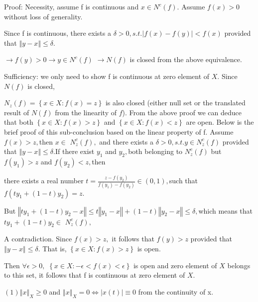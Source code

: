 \documentclass{article}
\begin{document}
Proof: Necessity, assume f is continuous and $x\in N^{c}\left( f\right) .$%
Assume $f\left( x\right) >0$ without loss of generality.

Since f is continuous, there exists a $\delta >0,s.t.\left\vert f\left(
x\right) -f\left( y\right) \right\vert <f\left( x\right) $ provided that $%
\left\Vert y-x\right\Vert \leq \delta .$

$\rightarrow f\left( y\right) >0\rightarrow y\in N^{c}\left( f\right) $ $%
\rightarrow N\left( f\right) $ is closed from the above equivalence.

Sufficiency: we only need to show f is continuous at zero element of $X.$
Since $N\left( f\right) $ is closed,

$N_{z}\left( f\right) =\left\{ x\in X:f\left( x\right) =z\right\} $ is also
closed (either null set or the translated result of  $N\left( f\right) $
from the linearity of $f$). From the above proof we can deduce that both $%
\left\{ x\in X:f\left( x\right) >z\right\} $ and $\left\{ x\in X:f\left(
x\right) <z\right\} $ are open. Below is the brief proof of this
sub-conclusion based on the linear property of f. Assume $f\left( x\right)
>z,$then $x\in $ $N_{z}^{c}\left( f\right) ,$ and there exists a $\delta
>0,s.t.y\in N_{z}^{c}\left( f\right) $ provided that $\left\Vert
y-x\right\Vert \leq \delta .$If there exist $y_{1}$ and $y_{2},$both
belonging to $N_{z}^{c}\left( f\right) $ but $f\left( y_{1}\right) >z$ and $%
f\left( y_{2}\right) <z,$then

there exists a real number $t=\frac{z-f\left( y_{2}\right) }{f\left(
y_{1}\right) -f\left( y_{2}\right) }\in \left( 0,1\right) ,$such that $%
f\left( ty_{1}+\left( 1-t\right) y_{2}\right) =z.$

But $\left\Vert ty_{1}+\left( 1-t\right) y_{2}-x\right\Vert \leq t\left\Vert
y_{1}-x\right\Vert +\left( 1-t\right) \left\Vert y_{2}-x\right\Vert \leq
\delta ,$which means that $ty_{1}+\left( 1-t\right) y_{2}\in $ $%
N_{z}^{c}\left( f\right) ,$

A contradiction. Since  $f\left( x\right) >z,$ it follows that $f\left(
y\right) >z$ provided that $\left\Vert y-x\right\Vert \leq \delta .$ That
is, $\left\{ x\in X:f\left( x\right) >z\right\} $ is open. 

Then $\forall \epsilon >0,$ $\left\{ x\in X:-\epsilon <f\left( x\right)
<\epsilon \right\} $ is open and zero element of $X$ belongs to this set, it
follows that  f is continuous at zero element of $X.$ 


$\left( 1\right) \left\Vert x\right\Vert _{X}\geq 0$ and $\left\Vert
x\right\Vert _{X}=0\iff \left\vert x\left( t\right) \right\vert \equiv 0$
from the continuity of x.
\end{document}
